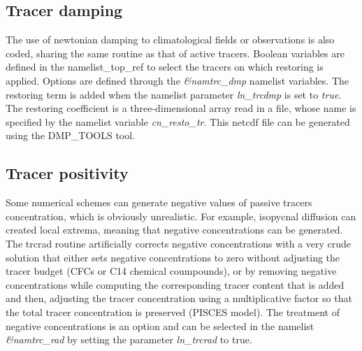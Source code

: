 \documentclass[../main/TOP_manual]{subfiles}
\begin{document}


\subsection{Tracer damping}

The use of newtonian damping  to climatological fields or observations is also coded, sharing the same routine as that of active tracers.
Boolean variables are defined in the namelist\_top\_ref to select the tracers on which restoring is applied.
Options are defined through the \textit{\&namtrc\_dmp} namelist variables.
The restoring term is added when the namelist parameter \textit{ln\_trcdmp} is set to \textit{true}.
The restoring coefficient is a three-dimensional array read in a file, whose name is specified by the namelist variable \textit{cn\_resto\_tr}.
This netcdf file can be generated using the DMP\_TOOLS tool.


\subsection{Tracer positivity}

Some numerical schemes can generate negative values of passive tracers concentration, which is obviously unrealistic.
For example,  isopycnal diffusion can created local extrema, meaning that negative concentrations can be generated.
The trcrad routine artificially corrects negative concentrations with a very crude solution that either sets negative concentrations to zero without adjusting the tracer budget (CFCs or C14 chemical coumpounds), or by removing negative concentrations while computing the corresponding tracer content that is added and then, adjusting the tracer concentration using a multiplicative factor so that the total tracer concentration is preserved (PISCES model). 
The treatment of negative concentrations is an option and can be selected in the namelist \textit{\&namtrc\_rad} by setting the parameter \textit{ln\_trcrad}  to true.
\end{document}
